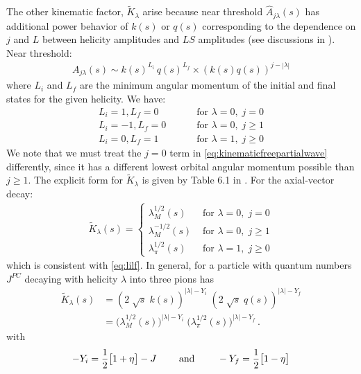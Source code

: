 The other kinematic factor, \(\tilde{K}_{\lambda}\) arise  because near threshold \(\hat{A}_{j\lambda}(s)\) has additional power behavior of \(k(s)\) or \(q(s)\) corresponding to the dependence on \(j\) and \(L\) between helicity amplitudes and \(LS\) amplitudes (see discussions in \cite{Jackson1968,Franklin1966}). Near threshold:
  \begin{gather}
    A_{j\lambda}(s) \sim k(s)^{L_i} \, q(s)^{L_f} \times (k(s)q(s))^{j- |\lambda|}
  \end{gather}
where \(L_i\) and \(L_f\) are the minimum angular momentum of the initial and final states for the given helicity. We have:
  \begin{align}
      L_i = 1, L_f = 0 &\qquad  \text{ for } \lambda = 0, \; j = 0   \nonumber \\
      L_i = -1, L_f = 0 &\qquad  \text{ for } \lambda = 0, \;  j \label{eq:lilf} \geq 1  \\
      L_i = 0 , L_f = 1 & \qquad  \text{ for } \lambda = 1, \; j \geq 0 \nonumber
  \end{align}
We note that we must treat the \(j=0\) term in \cref{eq:kinematicfreepartialwave} differently, since it has a different lowest orbital angular momentum possible than \(j\geq 1\). The explicit form for \(\tilde{K}_{\lambda}\) is given by Table 6.1 in \cite{Collins}. For the axial-vector decay:
  \begin{align}
    \label{eq:k-factor-tilde}
    \tilde{K}_{\lambda}(s) =
    \begin{cases}
       \lambda^{1/2}_M(s)    &     \text{  for }\lambda = 0, \; j=0 \\
       \lambda^{-1/2}_M(s)  &\text{ for } \lambda = 0, \; j\geq 1 \\
       \lambda_\pi^{1/2}(s)     &\text{ for } \lambda = 1, \; j\geq 0
    \end{cases}
  \end{align}
which is consistent with \cref{eq:lilf}. In general, for a particle with quantum numbers \(J^{PC}\) decaying with helicity \(\lambda\) into three pions has
  \begin{align}
    \tilde{K}_{\lambda }(s) &=  (2 \; \sqrt{s} \; k(s))^{|\lambda| - Y_i} \; (2 \; \sqrt{s} \; q(s))^{|\lambda| - Y_f} \nonumber \\
    &=   \big(\lambda^{1/2}_M(s)\big)^{|\lambda| - Y_i}
    \; \big(\lambda_\pi^{1/2}(s)\big)^{|\lambda| - Y_f}\, .
  \end{align}
with
  \begin{equation}
    -Y_i =  \frac{1}{2}\big[ 1 + \eta \big] - J \qquad \text{ and } \qquad  -Y_f =  \frac{1}{2} \big[ 1 - \eta \big]
    \end{equation}
